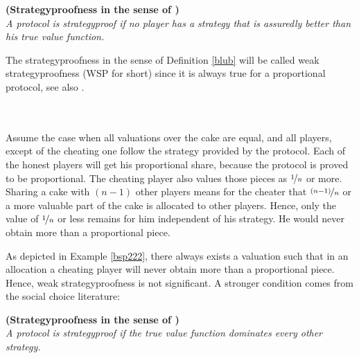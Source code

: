 \begin{defi}{\textbf{(Strategyproofness in the sense of \cite{pie})}}\\
\label{blub}\emph{A protocol is \emph{strategyproof} if no player has a strategy that is assuredly better than his true value function.}
\end{defi}
The strategyproofness in the sense of Definition \ref{blub} will be called weak strategyproofness (WSP for short) since it is always true for a proportional protocol, see also \cite{ccc}.
\begin{bsp}
\label{bsp222}
\textcolor{white}{x}\\\\
Assume the case when all valuations over the cake are equal, and all players, except of the cheating one follow the strategy provided by the protocol. Each of the honest players will get his proportional share, because the protocol is proved to be proportional. The cheating player also values those pieces as $\nicefrac{1}{n}$ or more. Sharing a cake with $(n-1)$ other players means for the cheater that $\nicefrac{(n-1)}{n}$ or a more valuable part of the cake is allocated to other players. Hence, only the value of $\nicefrac{1}{n}$ or less remains for him independent of his strategy. He would never obtain more than a proportional piece.
\end{bsp}
%
%
As depicted in Example \ref{bsp222}, there always exists a valuation such that in an allocation a cheating player will never obtain more than a proportional piece. Hence, weak strategyproofness is not significant.
\newline
A stronger condition comes from the social choice literature:

\begin{defi}{\textbf{(Strategyproofness in the sense of \cite{why})}}\\
\label{laberlaberlaber}\emph{A protocol is \emph{strategyproof} if the true value function dominates every other strategy.}
\end{defi}

